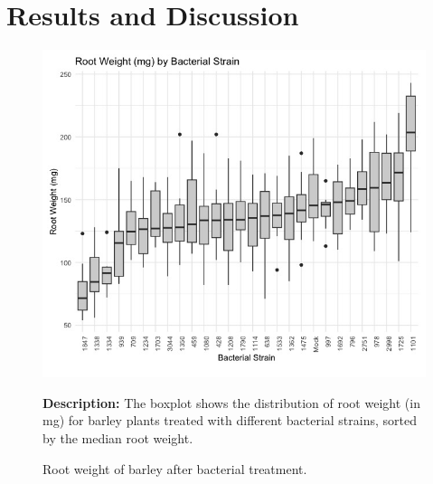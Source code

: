 \section{Results and Discussion}

\begin{figure}[!ht]
    \centering
    \raggedright
    \includegraphics[width=\linewidth]{Figures/Root Weight.jpeg}
    \caption{Root weight of barley after bacterial treatment.}
    \medskip
    \textbf{Description:} The boxplot shows the distribution of root weight (in mg) for barley plants treated with different bacterial strains, sorted by the median root weight.
    \label{fig:root_length_boxplot}
\end{figure}%


